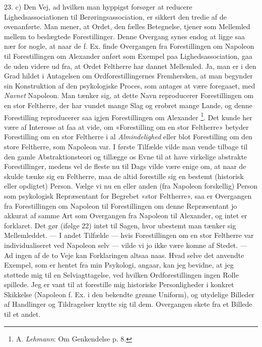 \documentclass[12pt,a4paper,openany]{book}
\newcommand{\opage}[1]{\marginnote{\footnotesize\textit{[#1]}}}
\begin{document}
23. c) Den Vej, ad hvilken man hyppigst forsøger at reducere
Lighedsassociationen til Berøringsassociation, er sikkert den tredie af de
ovenanførte. Man mener, at Ordet, den fælles Betegnelse, tjener som Mellemled
mellem to beslægtede Forestillinger. Denne Overgang synes endog at ligge saa
nær for nogle, at naar de f. Ex. finde Overgangen fra Forestillingen om
Napoleon til Forestillingen om Alexander anført som Exempel paa
Lighedsassociation, gaa de uden videre ud fra, at Ordet Feltherre har dannet
Mellemled. Ja, man er i den Grad hildet i Antagelsen om Ordforestillingernes
Fremhersken, at man begynder sin Konstruktion af den psykologiske Proces, som
antages at være foregaaet, med \emph{Navnet} Napoleon. Man tænker sig, at dette
Navn reproducerer Forestillingen om en stor Feltherre, der har vundet mange
Slag og erobret mange Lande, og denne Forestilling reproducerer saa igjen
Forestillingen om Alexander%
\footnote[1]{A. \emph{Lehmann}: Om Genkendelse p. 8.}. Det kunde her være af
Interesse at faa at vide, om «Forestilling om en stor Feltherre» betyder
Forestilling om en stor Feltherre i al \emph{Almindelighed} eller blot
Forestilling om den store Feltherre, som Napoleon var. I første Tilfælde vilde
man vende tilbage til den gamle Abstraktionsteori og tillægge os Evne til at
have virkelige abstrakte Forestillinger, medens vel de fleste nu til Dags vilde
være enige om, at naar de skulde tænke sig en Feltherre, maa de altid
\setcounter{footnote}{0}%
\opage{49}forestille sig en bestemt (historisk eller opdigtet) Person. Vælge vi
nu en eller anden (fra Napoleon forskellig) Person som psykologisk Repræsentant
for Begrebet «stor Feltherre», saa er Overgangen fra Forestillingen om Napoleon
til Forestillingen om denne Repræsentant jo akkurat af samme Art som Overgangen
fra Napoleon til Alexander, og intet er forklaret. Det gør (ifølge 22) intet
til Sagen, hvor ubestemt man tænker sig Mellemleddet. --- I andet Tilfælde ---
hvis Forestillingen om en stor Feltherre var individualiseret ved Napoleon selv
--- vilde vi jo ikke være komne af Stedet. --- Ad ingen af de to Veje kan
Forklaringen altsaa naas. Hvad selve det anvendte Exempel, som er hentet fra
min Psykologi, angaar, kan jeg bevidne, at jeg støttede mig til en
Selviagttagelse, ved hvilken Ordforestillingen ingen Rolle spillede. Jeg er
vant til at forestille mig historiske Personligheder i konkret Skikkelse
(Napoleon f. Ex. i den bekendte grønne Uniform), og utydelige Billeder af
Handlinger og Tildragelser knytte sig til dem. Overgangen skete fra et Billede
til et andet.
\end{document}
